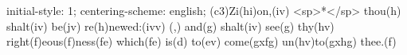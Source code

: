 initial-style: 1;
centering-scheme: english;
(c3)Zi(hi)on,(iv) <sp>*</sp> thou(h) shalt(iv) be(jv) re(h)newed:(ivv) (,) and(g) shalt(iv) see(g) thy(hv) right(f)eous(f)ness(fe) which(fe) is(d) to(ev) come(gxfg) un(hv)to(gxhg) thee.(f)

